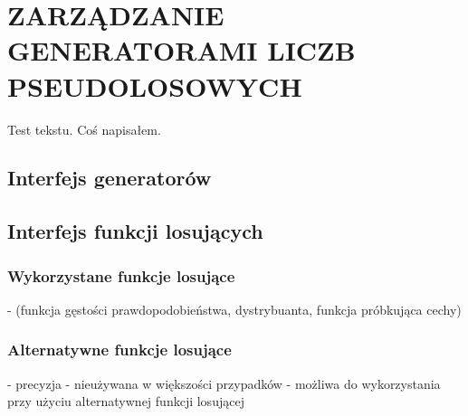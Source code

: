 \chapter{ZARZĄDZANIE GENERATORAMI LICZB PSEUDOLOSOWYCH}
\label{chpt:zarządzanie-generatorami-liczb-pseudolosowych}

Test tekstu. Coś napisałem.

\section{Interfejs generatorów}
\section{Interfejs funkcji losujących}
\subsection{Wykorzystane funkcje losujące}
- (funkcja gęstości prawdopodobieństwa, dystrybuanta, funkcja próbkująca cechy)
\subsection{Alternatywne funkcje losujące}

- precyzja
- nieużywana w większości przypadków
- możliwa do wykorzystania przy użyciu alternatywnej funkcji losującej
